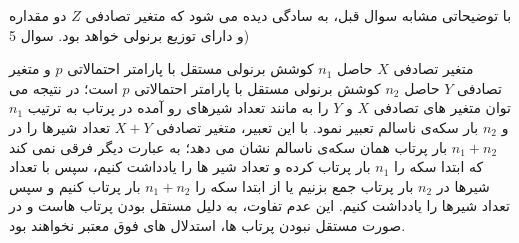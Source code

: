 \documentclass[10pt,letterpaper]{article}
\begin{document}
 با توضیحاتی مشابه سوال قبل، به سادگی دیده می شود که متغیر تصادفی $Z$ دو مقداره و دارای توزیع برنولی خواهد بود.
سوال 5)

متغیر تصادفی $X$ حاصل $n_1$ کوشش برنولی مستقل با پارامتر احتمالاتی $p$ و متغیر تصادفی $Y$ حاصل $n_2$ کوشش برنولی مستقل با پارامتر احتمالاتی $p$ است؛ در نتیجه می توان متغیر های تصادفی $X$ و $Y$ را به مانند تعداد شیرهای رو آمده در پرتاب به ترتیب $n_1$ و $n_2$ بار سکه‌ی ناسالم تعبیر نمود. با این تعبیر، متغیر تصادفی $X+Y$ تعداد شیرها را در $n_1+n_2$ بار پرتاب همان سکه‌ی ناسالم نشان می دهد؛ به عبارت دیگر فرقی نمی کند که ابتدا سکه را $n_1$ بار پرتاب کرده و تعداد شیر ها را یادداشت کنیم، سپس با تعداد شیرها در $n_2$ بار پرتاب جمع بزنیم یا از ابتدا سکه را $n_1+n_2$ بار پرتاب کنیم و سپس تعداد شیرها را یادداشت کنیم. این عدم تفاوت، به دلیل مستقل بودن پرتاب هاست و در صورت مستقل نبودن پرتاب ها، استدلال های فوق معتبر نخواهند بود.
\end{document}
